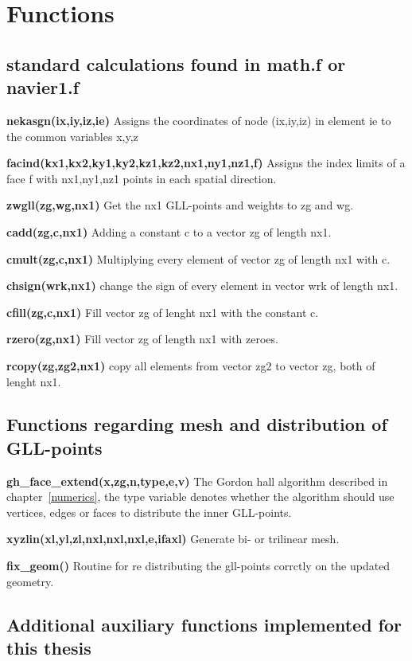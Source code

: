 \section{Functions}

\subsection{standard calculations found in math.f or navier1.f}

\textbf{nekasgn(ix,iy,iz,ie) } Assigns the coordinates of node 
    (ix,iy,iz) in element ie to the common variables x,y,z 

\textbf{facind(kx1,kx2,ky1,ky2,kz1,kz2,nx1,ny1,nz1,f) } 
Assigns the index limits of a face f with nx1,ny1,nz1 points in each spatial direction.

\textbf{zwgll(zg,wg,nx1)} Get the nx1 GLL-points and weights to zg and wg.

\textbf{cadd(zg,c,nx1)} Adding a constant c to a vector zg of length nx1.

\textbf{cmult(zg,c,nx1)} Multiplying every element of vector zg of length nx1 with c.

\textbf{chsign(wrk,nx1)} change the sign of every element in vector wrk of length nx1.

\textbf{cfill(zg,c,nx1)}  Fill vector zg of lenght nx1 with the constant c.

\textbf{rzero(zg,nx1) } Fill vector zg of length nx1 with zeroes.

\textbf{rcopy(zg,zg2,nx1) } copy all elements from vector zg2 to vector zg, both of lenght nx1.

\subsection{Functions regarding mesh and distribution of GLL-points}

\textbf{gh\_face\_extend(x,zg,n,type,e,v)}  The Gordon hall algorithm described in chapter~\ref{numerics}, the type variable denotes whether the 
algorithm should use vertices, edges or faces to distribute the inner GLL-points. 

\textbf{xyzlin(xl,yl,zl,nxl,nxl,nxl,e,ifaxl)} Generate bi- or trilinear mesh.

\textbf{fix\_geom()} Routine for re distributing the gll-points corrctly on the updated geometry.

\subsection{Additional auxiliary functions implemented for this thesis}

